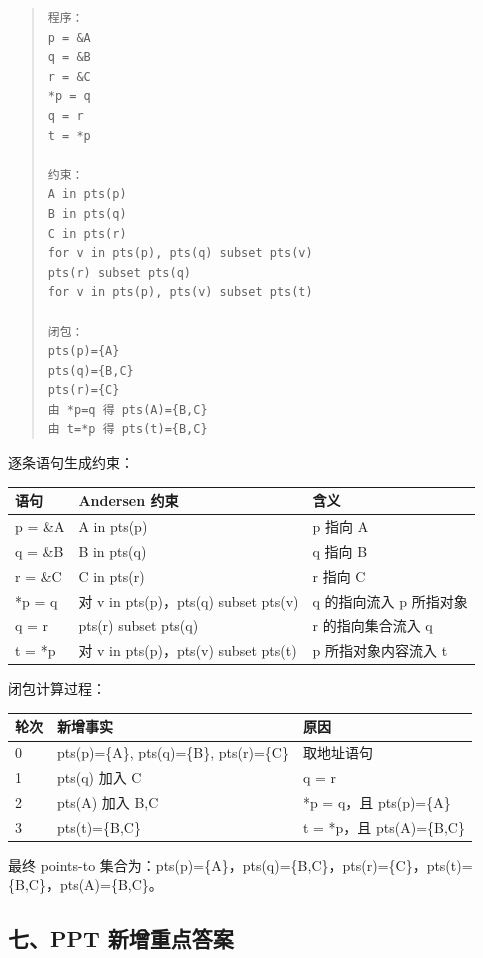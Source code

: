 \documentclass[UTF8,zihao=-4]{ctexart}
\begin{document}
\begin{quote}
\footnotesize
\begin{verbatim}
程序：
p = &A
q = &B
r = &C
*p = q
q = r
t = *p

约束：
A in pts(p)
B in pts(q)
C in pts(r)
for v in pts(p), pts(q) subset pts(v)
pts(r) subset pts(q)
for v in pts(p), pts(v) subset pts(t)

闭包：
pts(p)={A}
pts(q)={B,C}
pts(r)={C}
由 *p=q 得 pts(A)={B,C}
由 t=*p 得 pts(t)={B,C}
\end{verbatim}
\end{quote}

逐条语句生成约束：

\begin{center}
\footnotesize
\begin{tabular}{lll}
\hline
语句 & Andersen 约束 & 含义 \\
\hline
p = \&A & A in pts(p) & p 指向 A \\
q = \&B & B in pts(q) & q 指向 B \\
r = \&C & C in pts(r) & r 指向 C \\
*p = q & 对 v in pts(p)，pts(q) subset pts(v) & q 的指向流入 p 所指对象 \\
q = r & pts(r) subset pts(q) & r 的指向集合流入 q \\
t = *p & 对 v in pts(p)，pts(v) subset pts(t) & p 所指对象内容流入 t \\
\hline
\end{tabular}
\end{center}

闭包计算过程：

\begin{center}
\footnotesize
\begin{tabular}{lll}
\hline
轮次 & 新增事实 & 原因 \\
\hline
0 & pts(p)=\{A\}, pts(q)=\{B\}, pts(r)=\{C\} & 取地址语句 \\
1 & pts(q) 加入 C & q = r \\
2 & pts(A) 加入 B,C & *p = q，且 pts(p)=\{A\} \\
3 & pts(t)=\{B,C\} & t = *p，且 pts(A)=\{B,C\} \\
\hline
\end{tabular}
\end{center}

最终 points-to 集合为：pts(p)=\{A\}，pts(q)=\{B,C\}，pts(r)=\{C\}，pts(t)=\{B,C\}，pts(A)=\{B,C\}。



\subsection{七、PPT 新增重点答案}
\end{document}
